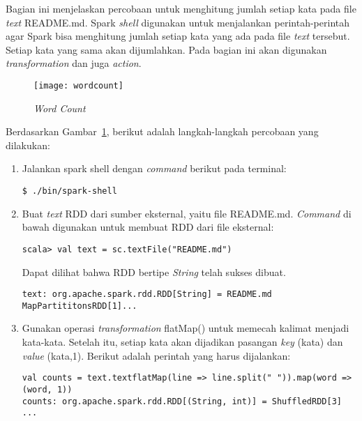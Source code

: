 Bagian ini  menjelaskan percobaan untuk menghitung jumlah setiap kata pada file \textit{text} README.md. Spark \textit{shell} digunakan untuk menjalankan perintah-perintah agar Spark bisa menghitung jumlah setiap kata yang ada pada file \textit{text} tersebut. Setiap kata yang sama akan dijumlahkan. Pada bagian ini akan digunakan \textit{transformation} dan juga \textit{action}.

\begin{figure}[H]
    \centering  
    \texttt{[image: wordcount]}  
    \caption[{\it Word Count} ]{{\it Word Count}} 
    \label{fig:wordcount} 
\end{figure}

Berdasarkan Gambar~\ref{fig:wordcount}, berikut adalah langkah-langkah percobaan yang dilakukan:

\begin{enumerate}

\item Jalankan spark shell dengan \textit{command} berikut pada terminal:

\begin{verbatim}
$ ./bin/spark-shell
\end{verbatim}

\item Buat \textit{text} RDD dari sumber eksternal, yaitu file README.md. \textit{Command} di bawah digunakan untuk membuat RDD dari file eksternal:

\begin{verbatim}
scala> val text = sc.textFile("README.md") 
\end{verbatim}

Dapat dilihat bahwa RDD bertipe \textit{String} telah sukses dibuat.

\begin{verbatim}
text: org.apache.spark.rdd.RDD[String] = README.md MapPartititonsRDD[1]...
\end{verbatim}


\item Gunakan operasi \textit{transformation} flatMap() untuk memecah kalimat menjadi kata-kata. Setelah itu, setiap kata akan dijadikan pasangan \textit{key} (kata) dan \textit{value} (kata,1). Berikut adalah perintah yang harus dijalankan:

\begin{verbatim}
val counts = text.textflatMap(line => line.split(" ")).map(word => (word, 1))
counts: org.apache.spark.rdd.RDD[(String, int)] = ShuffledRDD[3] ...
\end{verbatim}


\end{enumerate}
